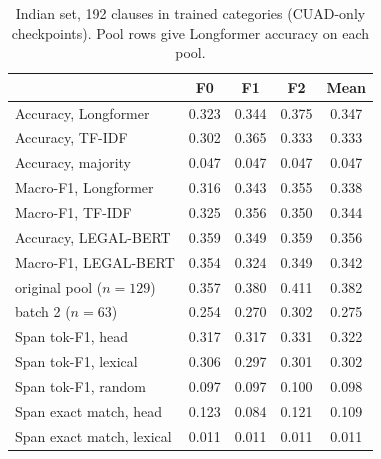 \documentclass[conference]{IEEEtran}
\begin{document}
\begin{table}[t]
\caption{Indian set, 192 clauses in trained categories (CUAD-only checkpoints). Pool rows give Longformer accuracy on each pool.}\label{tab:indian}
\centering
\begin{tabular}{lcccc}
\toprule
 & F0 & F1 & F2 & Mean\\
\midrule
Accuracy, Longformer & 0.323 & 0.344 & 0.375 & 0.347\\
Accuracy, TF-IDF & 0.302 & 0.365 & 0.333 & 0.333\\
Accuracy, majority & 0.047 & 0.047 & 0.047 & 0.047\\
Macro-F1, Longformer & 0.316 & 0.343 & 0.355 & 0.338\\
Macro-F1, TF-IDF & 0.325 & 0.356 & 0.350 & 0.344\\
Accuracy, LEGAL-BERT & 0.359 & 0.349 & 0.359 & 0.356\\
Macro-F1, LEGAL-BERT & 0.354 & 0.324 & 0.349 & 0.342\\
\midrule
\quad original pool ($n=129$) & 0.357 & 0.380 & 0.411 & 0.382\\
\quad batch 2 ($n=63$) & 0.254 & 0.270 & 0.302 & 0.275\\
\midrule
Span tok-F1, head & 0.317 & 0.317 & 0.331 & 0.322\\
Span tok-F1, lexical & 0.306 & 0.297 & 0.301 & 0.302\\
Span tok-F1, random & 0.097 & 0.097 & 0.100 & 0.098\\
Span exact match, head & 0.123 & 0.084 & 0.121 & 0.109\\
Span exact match, lexical & 0.011 & 0.011 & 0.011 & 0.011\\
\bottomrule
\end{tabular}
\end{table}
\end{document}
